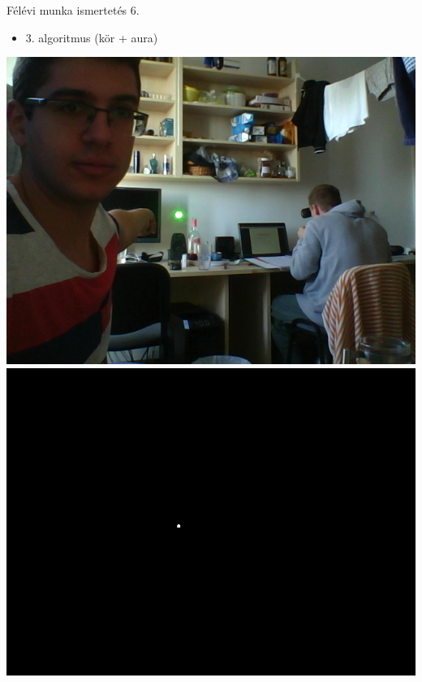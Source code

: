 \documentclass[17pt,xcolor=x11names]{beamer}
\begin{document}
\begin{frame}{Félévi munka ismertetés 6.}
\begin{itemize}
\item 3. algoritmus (kör + aura)
\end{itemize}
\begin{center}
\includegraphics[scale=0.225]{figs/laser.png}
\hspace{20pt}
\includegraphics[scale=0.225]{figs/laser3-b.png}
\end{center}
\end{frame}
\end{document}
